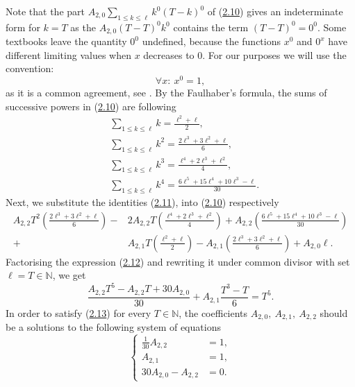 \documentclass[11pt, letterpaper]{amsart}
\theoremstyle{definition}
\theoremstyle{remark}
\numberwithin{equation}{section}
\begin{document}
Note that the part $A_{2,0}\sum\nolimits_{1\leq k \leq \ell}k^0(T-k)^0$ of (\hyperref[alb_3_1]{2.10}) gives an indeterminate form for $k=T$ as the $A_{2,0}(T-T)^0k^0$ contains the term $(T-T)^0=0^0$. Some textbooks leave the quantity $0^0$ undefined, because the functions $x^0$ and $0^x$ have different limiting values when $x$ decreases to $0$. For our purposes we will use the convention:
$$\forall x: \ x^0 = 1,$$
as it is a common agreement, see \cite{16}.
By the Faulhaber's formula, the sums of successive powers in (\hyperref[alb_3_1]{2.10}) are following
\begin{equation}\label{alb_3_1_1}
\begin{split}
&\sum\limits_{1\leq k \leq \ell} k = \frac{\ell^2+\ell}{2}, \\
&\sum\limits_{1\leq k \leq \ell} k^2 = \frac{2\ell^3+3\ell^2+\ell}{6}, \\
&\sum\limits_{1\leq k \leq \ell} k^3 = \frac{\ell^4+2\ell^3+\ell^2}{4}, \\
&\sum\limits_{1\leq k \leq \ell} k^4 = \frac{6\ell^5+15\ell^4+10\ell^3-\ell}{30}.
\end{split}
\end{equation}
Next, we substitute the identities (\hyperref[alb_3_1_1]{2.11}), into (\hyperref[alb_3_1]{2.10}) respectively
\begin{equation}\label{alb_3_1_2}
\begin{split}
A_{2,2}T^2\left(\frac{2\ell^3+3\ell^2+\ell}{6}\right)
-&2A_{2,2}T\left(\frac{\ell^4+2\ell^3+\ell^2}{4}\right)+A_{2,2}\left(\frac{6\ell^5+15\ell^4+10\ell^3-\ell}{30}\right)\\
+&A_{2,1}T\left(\frac{\ell^2+\ell}{2}\right)-A_{2,1}\left(\frac{2\ell^3+3\ell^2+\ell}{6}\right)+A_{2,0}\ell.
\end{split}
\end{equation}
Factorising the expression (\hyperref[alb_3_1_2]{2.12}) and rewriting it under common divisor with set $\ell=T\in\mathbb{N}$, we get
\begin{equation}\label{alb_3}
\frac{A_{2,2}T^5-A_{2,2}T+30A_{2,0}}{30}+A_{2,1}\frac{T^3-T}{6}=T^5.
\end{equation}
In order to satisfy (\hyperref[alb_3]{2.13}) for every $T\in\mathbb{N}$, the coefficients $A_{2,0}, \ A_{2,1}, \ A_{2,2}$ should be a solutions to the following system of equations
\begin{equation}\label{alb_5}
\begin{cases}
\frac{1}{30}A_{2,2} &=1, \\
A_{2,1} &=1, \\
30A_{2,0}-A_{2,2}&=0.
\end{cases}
\end{equation}
\end{document}
